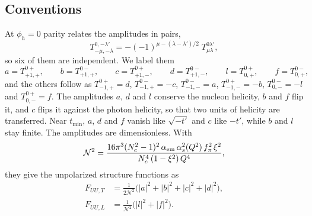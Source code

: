 \documentclass[aps,prd,showpacs,notitlepage,nofootinbib,preprintnumbers,amsmath,amssymb]{revtex4-2}
\begin{document}
\subsection{Conventions}

At $\phi_h=0$ parity relates the amplitudes in pairs,
\begin{equation}
T^{0,-\lambda'}_{-\mu,-\lambda}=-(-1)^{\mu-(\lambda-\lambda')/2}\;T^{0\lambda'}_{\mu\lambda},
\label{eq:hel_parity}
\end{equation}
so six of them are independent. We label them
\begin{equation}
a=T^{0+}_{+1,+},\qquad b=T^{0-}_{+1,+},\qquad c=T^{0+}_{+1,-},\qquad d=T^{0-}_{+1,-},\qquad l=T^{0+}_{0,+},\qquad f=T^{0-}_{0,+},
\label{eq:hel_abcd}
\end{equation}
and the others follow as $T^{0+}_{-1,+}=d$, $T^{0-}_{-1,+}=-c$, $T^{0-}_{-1,-}=a$, $T^{0+}_{-1,-}=-b$, $T^{0-}_{0,-}=-l$ and $T^{0+}_{0,-}=f$. The amplitudes $a$, $d$ and $l$ conserve the nucleon helicity, $b$ and $f$ flip it, and $c$ flips it against the photon helicity, so that two units of helicity are transferred. Near $t_{\min}$, $a$, $d$ and $f$ vanish like $\sqrt{-t'}$ and $c$ like $-t'$, while $b$ and $l$ stay finite. The amplitudes are dimensionless. With
\begin{equation}
\mathcal N^2=\frac{16\pi^3(N_c^2-1)^2\,\alpha_{\rm em}\,\alpha_s^2(Q^2)\,f_\pi^2\,\xi^2}{N_c^4\,(1-\xi^2)\,Q^4},
\label{eq:hel_N}
\end{equation}
they give the unpolarized structure functions as
\begin{subequations}\label{eq:hel_norm}
\begin{align}
F_{UU,T}&=\frac{1}{2\mathcal N^2}\big(|a|^2+|b|^2+|c|^2+|d|^2\big),\\
F_{UU,L}&=\frac{1}{\mathcal N^2}\big(|l|^2+|f|^2\big).
\end{align}
\end{subequations}
\end{document}
